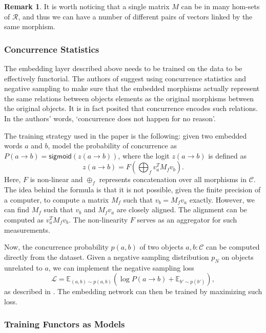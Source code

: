 \documentclass[12pt,a4paper,openright,twoside]{report}
\theoremstyle{plain}
\theoremstyle{definition}
\newtheorem{remark}[proposition]{Remark}
\begin{document}
\begin{remark}
  It is worth noticing that a single matrix $M$ can be in many hom-sets of $\mathcal{R}$, and thus we can have a number of different pairs of vectors linked by the same morphism.
\end{remark}


\subsubsection{Concurrence Statistics}

The embedding layer described above needs to be trained on the data to be effectively functorial. The authors of \cite{sheshmani2021categorical} suggest using concurrence statistics and negative sampling to make sure that the embedded morphisms actually represent the same relations between objects elements as the original morphisms between the original objects. It is in fact posited that concurrence encodes such relations. In the authors' words, \lq  concurrence does not happen for no reason\rq.


The training strategy used in the paper is the following: given two embedded words $a$ and $b$, model the probability of concurrence as $P(a \to b) = \mathsf{sigmoid}(z(a \to b))$, where the logit $z(a \to b)$ is defined as
\[z(a \to b) = F\left(\bigoplus_f v_a^TM_fv_b \right).\]
Here, $F$ is non-linear and $\oplus_f$ represents concatenation over all morphisms in $\mathcal{C}$. The idea behind the formula is that it is not possible, given the finite precision of a computer, to compute a matrix $M_f$ such that $v_b = M_fv_a$ exactly. However, we can find $M_f$ such that $v_b$ and $M_fv_a$ are closely aligned. The alignment can be computed as $v_a^TM_fv_b$. The non-linearity $F$ serves as an aggregator for such measurements.


Now, the concurrence probability $p(a,b)$ of two objects $a,b : \mathcal{C}$ can be computed directly from the dataset. Given a negative sampling distribution $p_N$ on objects unrelated to $a$, we can implement the negative sampling loss
\[\mathcal{L} = \mathbb{E}_{(a,b) \sim p(a,b)}\left(\log P(a \to b) + \mathbb{E}_{b' \sim p(b')}\right),\]
as described in \cite{sheshmani2021categorical}. The embedding network can then be trained by maximizing such loss.


\subsubsection{Training Functors as Models}
\end{document}
